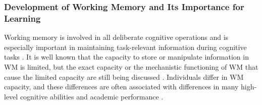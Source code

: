 \subsubsection{Development of Working Memory and Its Importance for Learning} 
Working memory is involved in all deliberate cognitive operations \parencite{oberauerBenchmarksModelsShortterm2018} and is especially important in maintaining task-relevant information during cognitive tasks \parencite{baddeleyWorkingMemory1974, danemanIndividualDifferencesWorking1980}. It is well known that the capacity to store or manipulate information in WM is limited, but the exact capacity or the mechanistic functioning of WM that cause the limited capacity are still being discussed \parencite[see.,][]{oberauerWhatLimitsWorking2016,cowanMagicalMysteryFour2010}. Individuals differ in WM capacity, and these differences are often associated with differences in many high-level cognitive abilities \parencite{danemanIndividualDifferencesWorking1980, unsworthWorkingMemoryFluid2014,unsworthDivisionShorttermWorking2007,miyakeHowAreVisuospatial2001, cowanCapacityAttentionIts2005} and academic performance \parencite{gathercoleWorkingMemoryAssessments2003,gathercoleWorkingMemorySkills2004}. 
